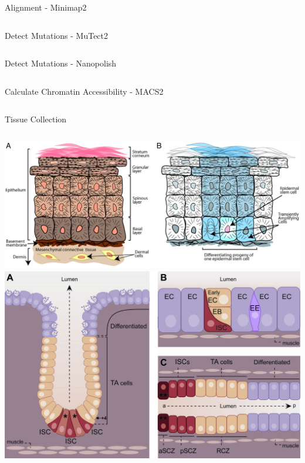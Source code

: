 \documentclass{beamer}
\begin{document}
\begin{frame}{Alignment - Minimap2}
\begin{columns}
\end{columns}
\end{frame}

\begin{frame}{Detect Mutations - MuTect2}
\begin{columns}
\end{columns}
\end{frame}

\begin{frame}{Detect Mutations - Nanopolish}
\begin{columns}
\end{columns}
\end{frame}

\begin{frame}{Calculate Chromatin Accessibility - MACS2}
\begin{columns}
\end{columns}
\end{frame}

\begin{frame}{Tissue Collection}
\begin{columns}
\includegraphics[width=\linewidth]{alonso_2003_skin.jpg}
\includegraphics[width=\linewidth]{casali_2009_intestine.jpg}
\end{columns}
\end{frame}
\end{document}
